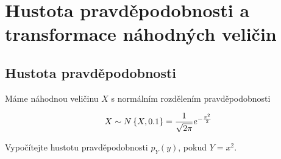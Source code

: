 \chapter{Hustota pravděpodobnosti a transformace náhodných veličin}
\section{Hustota pravděpodobnosti}
Máme náhodnou veličinu $X$ s normálním rozdělením pravděpodobnosti

\[ X\sim N\left\{X,0.1\right\}= \frac{1}{\sqrt{2\pi}}e^{-\frac{x^2}{2}} \]

Vypočítejte hustotu pravděpodobnosti $p_Y(y)$, pokud $Y=x^2$.

